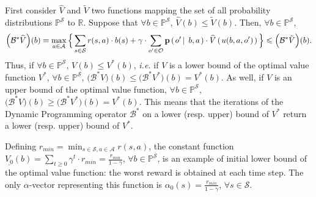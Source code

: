 First consider $\widehat{V}$ and $\tilde{V}$
two functions mapping the set of all probability distributions 
$\mathbb{P}^{\mathcal{S}}$ to $\mathbb{R}$.
Suppose that $\forall b \in \mathbb{P}^{\mathcal{S}}$, 
$\widehat{V}(b) \leqslant \tilde{V}(b)$.
Then, $\forall b \in \mathbb{P}^{\mathcal{S}}$, 
\[ \Big(\mathcal{B}^* \widehat{V} \Big) (b) = \max_{a \in \mathcal{A}} \Big\{ \sum_{s \in \mathcal{S}} r(s,a) \cdot b(s) + \gamma \cdot \sum_{o' \in \mathcal{O}} \textbf{p} \left( \left. o' \, \right| \left. \, b , a  \right. \right) \cdot \widehat{V} \left( \left.  u(b,a,o')   \right. \right) \Big\} \leqslant \Big( \mathcal{B}^* \tilde{V} \Big)(b) . \]
Thus, if $\forall b \in \mathbb{P}^{\mathcal{S}}$, $V(b) \leqslant V^*(b)$,
\textit{i.e.} if $V$ is a lower bound of the optimal value function $V^*$,
$\forall b \in \mathbb{P}^{\mathcal{S}}$,
$\Big( \mathcal{B}^* V \Big) (b) \leqslant \Big( \mathcal{B}^* V^* \Big) (b) = V^*(b)$.
As well, if $V$ is an upper bound of the optimal value function,
$\forall b \in \mathbb{P}^{\mathcal{S}}$,
$\Big( \mathcal{B}^* V \Big) (b) \geqslant \Big( \mathcal{B}^* V^* \Big) (b) = V^*(b)$.
This means that the iterations of the Dynamic Programming operator $\mathcal{B}^*$
on a lower (resp. upper) bound of $V^*$ return a lower (resp. upper)
bound of $V^*$.

Defining $r_{min} = \min_{s \in \mathcal{S}, a \in \mathcal{A}} r(s,a)$, 
the constant function $\underline{V_0}(b) = \sum_{t \geqslant 0} \gamma^t \cdot r_{min} = \frac{r_{min}}{1 - \gamma }$,
$\forall b \in \mathbb{P}^{\mathcal{S}}$,
is an example of initial lower bound 
of the optimal value function:
the worst reward is obtained at each time step.
The only $\alpha$-vector
representing this function is 
$\alpha_0(s) = \frac{r_{min}}{1 - \gamma }$, $\forall s \in \mathcal{S}$.

